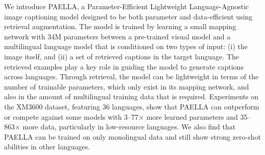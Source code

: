 We introduce PAELLA, a Parameter-Efficient Lightweight Language-Agnostic image captioning model designed to be both parameter and data-efficient using retrieval augmentation. The model is trained by learning a small mapping network with 34M parameters between a pre-trained visual model and a multilingual language model that is conditioned on two types of input: (i) the image itself, and (ii) a set of retrieved captions in the target language. The retrieved examples play a key role in guiding the model to generate captions across languages. Through retrieval, the model can be lightweight in terms of the number of trainable parameters, which only exist in its mapping network, and also in the amount of multilingual training data that is required. Experiments on the XM3600 dataset, featuring 36 languages, show that PAELLA can outperform or compete against some models with 3--77$\times$ more learned parameters and 35--863$\times$ more data, particularly in low-resource languages.  We also find that PAELLA can be trained on only monolingual data and still show strong zero-shot abilities in other languages.